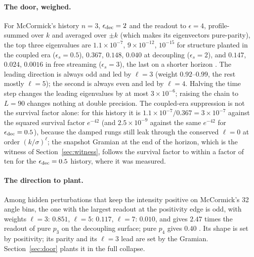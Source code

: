 \paragraph{The door, weighed.} For McCormick's history $n=3$, $\epsilon_{\rm dec}=2$ and the readout to $\epsilon=4$, profile-summed over $k$ and averaged over $\pm k$ (which makes its eigenvectors pure-parity), the top three eigenvalues are $1.1\times10^{-7}$, $9\times10^{-12}$, $10^{-15}$ for structure planted in the coupled era ($\epsilon_s=0.5$), $0.367$, $0.148$, $0.040$ at decoupling ($\epsilon_s=2$), and $0.147$, $0.024$, $0.0016$ in free streaming ($\epsilon_s=3$), the last on a shorter horizon . The leading direction is always odd and led by $\ell=3$ (weight $0.92$--$0.99$, the rest mostly $\ell=5$); the second is always even and led by $\ell=4$. Halving the time step changes the leading eigenvalues by at most $3\times10^{-6}$; raising the chain to $L=90$ changes nothing at double precision. The coupled-era suppression is not the survival factor alone: for this history it is $1.1\times10^{-7}/0.367=3\times10^{-7}$ against the squared survival factor $e^{-42}$ (and $2.5\times10^{-9}$ against the same $e^{-42}$ for $\epsilon_{\rm dec}=0.5$), because the damped rungs still leak through the conserved $\ell=0$ at order $(k/\sigma)^\ell$; the snapshot Gramian at the end of the horizon, which is the witness of Section~\ref{sec:witness}, follows the survival factor to within a factor of ten for the $\epsilon_{\rm dec}=0.5$ history, where it was measured.

\paragraph{The direction to plant.} Among hidden perturbations that keep the intensity positive on McCormick's 32 angle bins, the one with the largest readout at the positivity edge is odd, with weights $\ell=3$: $0.851$, $\ell=5$: $0.117$, $\ell=7$: $0.010$, and gives $2.47$ times the readout of pure $p_3$ on the decoupling surface; pure $p_4$ gives $0.40$ . Its shape is set by positivity; its parity and its $\ell=3$ lead are set by the Gramian. Section~\ref{sec:door} plants it in the full collapse.

